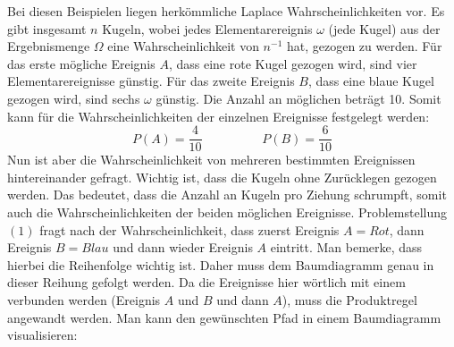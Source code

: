 Bei diesen Beispielen liegen herk\"{o}mmliche Laplace Wahrscheinlichkeiten vor. Es gibt insgesamt $n$ Kugeln, wobei jedes Elementarereignis $\omega$ (jede Kugel) aus der Ergebnismenge $\Omega$ eine Wahrscheinlichkeit von $n^{-1}$ hat, gezogen zu werden. F\"{u}r das erste m\"{o}gliche Ereignis $A$, dass eine rote Kugel gezogen wird, sind vier Elementarereignisse g\"{u}nstig. F\"{u}r das zweite Ereignis $B$, dass eine blaue Kugel gezogen wird, sind sechs $\omega$ g\"{u}nstig. Die Anzahl an m\"{o}glichen betr\"{a}gt 10. Somit kann f\"{u}r die Wahrscheinlichkeiten der einzelnen Ereignisse festgelegt werden: $$P(A) = \frac{4}{10} \hspace{2cm} P(B) = \frac{6}{10}$$ Nun ist aber die Wahrscheinlichkeit von mehreren bestimmten Ereignissen hintereinander gefragt. Wichtig ist, dass die Kugeln ohne Zur\"{u}cklegen gezogen werden. Das bedeutet, dass die Anzahl an Kugeln pro Ziehung schrumpft, somit auch die Wahrscheinlichkeiten der beiden m\"{o}glichen Ereignisse. Problemstellung $(1)$ fragt nach der Wahrscheinlichkeit, dass zuerst Ereignis $A = Rot$, dann Ereignis $B = Blau$ und dann wieder Ereignis $A$ eintritt. Man bemerke, dass hierbei die Reihenfolge wichtig ist. Daher muss dem Baumdiagramm genau in dieser Reihung gefolgt werden. Da die Ereignisse hier w\"{o}rtlich mit einem  verbunden werden (Ereignis $A$ und $B$ und dann $A$), muss die Produktregel angewandt werden. Man kann den gew\"{u}nschten Pfad in einem Baumdiagramm visualisieren:

